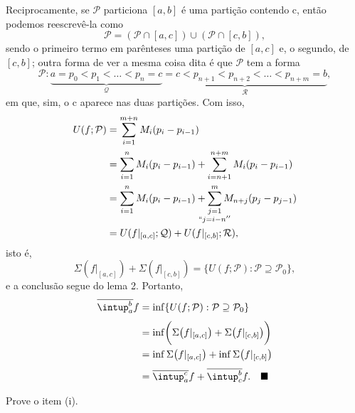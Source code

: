\documentclass[../analysisII_notes.tex]{subfiles}
\begin{document}
\begin{proof*}
	Reciprocamente, se \(\mathcal{P}\) particiona \([a, b]\) é uma partição contendo c, então podemos reescrevê-la como
	\[
		\mathcal{P}=(\mathcal{P}\cap [a, c])\cup (\mathcal{P}\cap [c, b]),
	\]
	sendo o primeiro termo em parênteses uma partição de \([a, c]\) e, o segundo, de \([c, b]\); outra forma de ver a mesma coisa dita é que \(\mathcal{P}\) tem a forma
	\[
		\mathcal{P}: \underbrace{a = p_{0} < p_{1} < \dotsc < p_{n}=c}_{\mathcal{Q}} \underbrace{=c< p_{n+1}<p_{n+2}<\dotsc <p_{n+m}=b}_{\mathcal{R}},
	\]
	em que, sim, o c aparece nas duas partições. Com isso,
	\begin{align*}
		U(f; \mathcal{P}) & = \sum\limits_{i=1}^{m+n}M_{i}(p_{i}-p_{i-1})                                              \\
		                  & =\sum\limits_{i=1}^{n}M_{i}(p_{i}-p_{i-1}) + \sum\limits_{i=n+1}^{n+m}M_{i}(p_{i}-p_{i-1}) \\
		                  & = \sum\limits_{i=1}^{n}M_{i}(p_{i}-p_{i-1}) + \sum\limits_{\mathclap{\substack{j=1         \\ ``j=i-n''}}}^{m}M_{n+j}(p_{j}-p_{j-1})\\
		                  & = U(f|_{[a, c]}; \mathcal{Q}) + U(f|_{[c, b]}; \mathcal{R}),
	\end{align*}
	isto é,
	\[
		\Sigma (f|_{[a, c]})+\Sigma (f|_{[c, b]})=\{U(f; \mathcal{P}):\mathcal{P}\supseteq \mathcal{P}_{0}\},
	\]
	e a conclusão segue do lema 2. Portanto,
	\begin{align*}
		\overline{\intup_{a}^{b}}f & = \inf_{}\{U(f; \mathcal{P}):\mathcal{P}\supseteq \mathcal{P}_{0}\}                    \\
		                           & = \inf_{}\biggl(\Sigma \bigl(f|_{[a, c]}\bigr) + \Sigma \bigl(f|_{[c, b]}\bigr)\biggr) \\
		                           & = \inf_{}\Sigma \bigl(f|_{[a, c]}\bigr) + \inf_{}\Sigma \bigl(f|_{[c, b]}\bigr)        \\
		                           & = \overline{\intup_{a}^{c}}f + \overline{\intup_{c}^{b}}f.\quad \text{\qedsymbol}
	\end{align*}
\end{proof*}
\begin{exr}
	Prove o item (i).
\end{exr}
\end{document}
